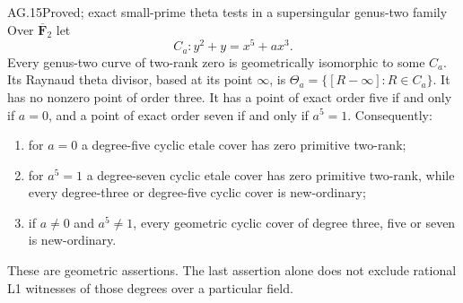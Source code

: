 \begin{claim}{AG.15}{Proved; exact small-prime theta tests in a supersingular genus-two family}
Over $\overline{\mathbf F}_2$ let
\[
                      C_a:y^2+y=x^5+a x^3.
\]
Every genus-two curve of two-rank zero is geometrically
isomorphic to some $C_a$.
Its Raynaud theta divisor, based at its point $\infty$,
is $\Theta_a=\{[R-\infty]:R\in C_a\}$.
It has no nonzero point of order three. It has a point
of exact order five if and only if $a=0$, and a point
of exact order seven if and only if $a^5=1$.
Consequently:
\begin{enumerate}
\item for $a=0$ a degree-five cyclic etale cover has
      zero primitive two-rank;
\item for $a^5=1$ a degree-seven cyclic etale cover has
      zero primitive two-rank, while every degree-three
      or degree-five cyclic cover is new-ordinary;
\item if $a\ne0$ and $a^5\ne1$, every geometric cyclic
      cover of degree three, five or seven is new-ordinary.
\end{enumerate}
These are geometric assertions. The last assertion alone
does not exclude rational L1 witnesses of those degrees
over a particular field.
\end{claim}
